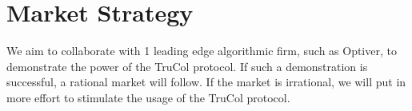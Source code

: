 \vspace{-0.16cm}
\section{Market Strategy}
\vspace{-0.15cm}
We aim to collaborate with 1 leading edge algorithmic firm, such as Optiver, to demonstrate the power of the TruCol protocol. If such a demonstration is successful, a rational market will follow. If the market is irrational, we will put in more effort to stimulate the usage of the TruCol protocol.
